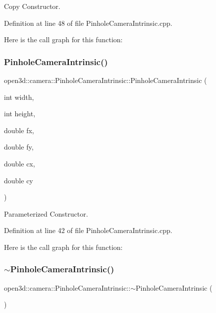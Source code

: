Copy Constructor. 



Definition at line 48 of file Pinhole\+Camera\+Intrinsic.\+cpp.

Here is the call graph for this function\+:
\mbox{\label{classopen3d_1_1camera_1_1_pinhole_camera_intrinsic_a9b0c541b362f60d55702997c7ad85bf2}} 
\subsubsection{\texorpdfstring{PinholeCameraIntrinsic()}{PinholeCameraIntrinsic()}\hspace{0.1cm}{\footnotesize\ttfamily [3/3]}}
{\footnotesize\ttfamily open3d\+::camera\+::\+Pinhole\+Camera\+Intrinsic\+::\+Pinhole\+Camera\+Intrinsic (\begin{DoxyParamCaption}\item[{int}]{width,  }\item[{int}]{height,  }\item[{double}]{fx,  }\item[{double}]{fy,  }\item[{double}]{cx,  }\item[{double}]{cy }\end{DoxyParamCaption})}



Parameterized Constructor. 



Definition at line 42 of file Pinhole\+Camera\+Intrinsic.\+cpp.

Here is the call graph for this function\+:
\mbox{\label{classopen3d_1_1camera_1_1_pinhole_camera_intrinsic_a2a960b4cd603659c2bc123d1d8b38a3a}} 
\subsubsection{\texorpdfstring{$\sim$PinholeCameraIntrinsic()}{~PinholeCameraIntrinsic()}}
{\footnotesize\ttfamily open3d\+::camera\+::\+Pinhole\+Camera\+Intrinsic\+::$\sim$\+Pinhole\+Camera\+Intrinsic (\begin{DoxyParamCaption}{ }\end{DoxyParamCaption})\hspace{0.3cm}{\ttfamily [override]}}



